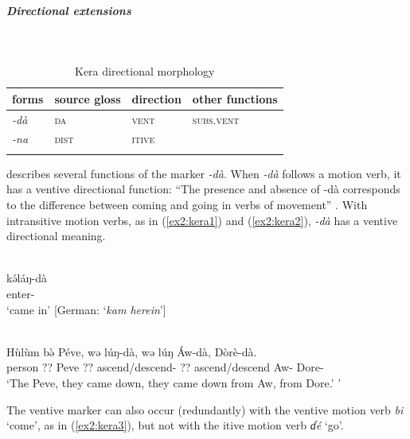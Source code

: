\subparagraph{Directional extensions}~

\begin{table}[H]
	\caption{Kera directional morphology}
	\label{tab:kera}
	\begin{tabular}{llll} %
		\lsptoprule
		forms & source gloss & direction  & other functions  \\ %
		\midrule
		\textit{-dà}  &  \textsc{da}  & \textsc{vent}   &  \textsc{subs.vent} \\
		\textit{-na}  &  \textsc{dist}  & \textsc{itive}   &  \\
		\lspbottomrule
	\end{tabular}
\end{table}

\citet[113--116]{ebertSpracheUndTradition1979} describes several functions of the marker \textit{-dà}. When \textit{-dà} follows a motion verb, it has a ventive directional function: ``The presence and absence of -dà corresponds to the difference between coming and going in verbs of movement'' \citep[114]{ebertSpracheUndTradition1979}. With intransitive motion verbs, as in (\ref{ex2:kera1}) and (\ref{ex2:kera2}), \textit{-dà} has a ventive directional meaning. 

\ea\label{ex2:kera1}
 \\
\gll kə́láŋ-dà	\\
enter-	\\
\glt `came in' [German: `\textit{kam herein}']

\ex\label{ex2:kera2}
 \\
\gll Hùlùm bə̀ Péve, wə lúŋ-dà, wə lúŋ Áw-dà, Dòrè-dà.	\\
person ?? Peve ?? ascend/descend- ?? ascend/descend Aw- Dore-	\\
\glt `The Peve, they came down, they came down from Aw, from Dore.' 	'
\z 

The ventive marker can also occur (redundantly) with the ventive motion verb \textit{bi} `come', as in (\ref{ex2:kera3}), but not with the itive motion verb \textit{ɗé} `go'.

